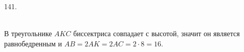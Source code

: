 141. \begin{figure}[ht!]
\end{figure}\\
В треугольнике $AKC$ биссектриса совпадает с высотой, значит он является равнобедренным и $AB=2AK=2AC=2\cdot8=16.$\\
